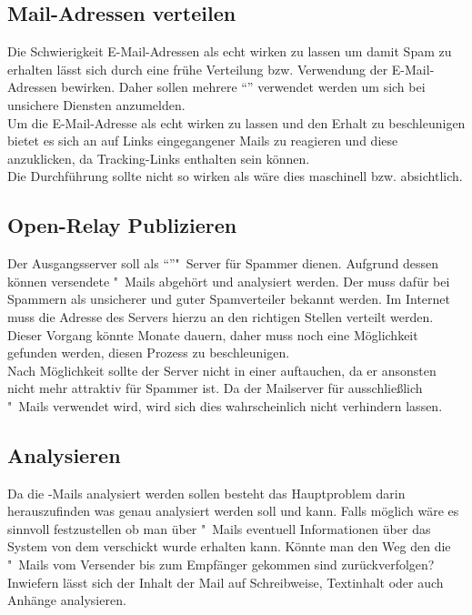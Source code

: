 \documentclass[a4paper,11pt,singlespacing]{article}
\begin{document}
	\subsection{Mail-Adressen verteilen}\label{sec:ProblemstellungMailsVerteilen}
		Die Schwierigkeit E-Mail-Adressen als echt wirken zu lassen um damit Spam zu erhalten lässt sich durch eine frühe Verteilung bzw. Verwendung der E-Mail-Adressen bewirken.
		Daher sollen mehrere "`"' verwendet werden um sich bei unsichere Diensten anzumelden.
		\\
		Um die E-Mail-Adresse als echt wirken zu lassen und den Erhalt zu beschleunigen bietet es sich an auf Links eingegangener Mails zu reagieren und diese anzuklicken, da Tracking-Links enthalten sein können. %
		\\
		Die Durchführung sollte nicht so wirken als wäre dies maschinell bzw. absichtlich.
	
	\subsection{Open-Relay Publizieren}\label{sec:ProblemstellungPublizieren}
		Der Ausgangsserver soll als "`"'"~Server für Spammer dienen.
		Aufgrund dessen können versendete "~Mails abgehört und analysiert werden.
		Der  muss dafür bei Spammern als unsicherer und guter Spamverteiler bekannt werden.
		Im Internet muss die Adresse des Servers hierzu an den richtigen Stellen verteilt werden.
		Dieser Vorgang könnte Monate dauern, daher muss noch eine Möglichkeit gefunden werden, diesen Prozess zu beschleunigen.
		\\
		Nach Möglichkeit sollte der Server nicht in einer   auftauchen, da er ansonsten nicht mehr attraktiv für Spammer ist.
		Da der Mailserver für ausschließlich "~Mails verwendet wird, wird sich dies wahrscheinlich nicht verhindern lassen.

	\subsection{Analysieren}\label{sec:ProblemstellungAnalysieren}
		Da die -Mails analysiert werden sollen besteht das Hauptproblem darin herauszufinden was genau analysiert werden soll und kann.
		Falls möglich wäre es sinnvoll festzustellen ob man über "~Mails eventuell Informationen über das System von dem verschickt wurde erhalten kann.
		Könnte man den Weg den die "~Mails vom Versender bis zum Empfänger gekommen sind zurückverfolgen?
		Inwiefern lässt sich der Inhalt der Mail auf Schreibweise, Textinhalt oder auch Anhänge analysieren.
\end{document}
